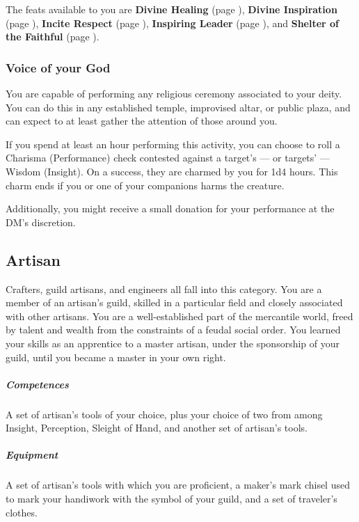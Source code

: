     The feats available to you are
    \textbf{Divine Healing} (page \pageref{feat::divinehealing}),
    \textbf{Divine Inspiration} (page \pageref{feat::divineinspiration}),
    \textbf{Incite Respect} (page \pageref{feat::inciterespect}),
    \textbf{Inspiring Leader} (page \pageref{feat::inspiringleader}), and
    \textbf{Shelter of the Faithful} (page \pageref{feat::shelterofthefaithful}).

    \subsubsection{Voice of your God} \label{feat::voiceofyourgod}
        You are capable of performing any religious ceremony associated to your deity.
        You can do this in any established temple, improvised altar, or public plaza, and can expect to at least gather the attention of those around you.

        If you spend at least an hour performing this activity, you can choose to roll a Charisma (Performance) check contested against a target's --- or targets' --- Wisdom (Insight).
        On a success, they are charmed by you for 1d4 hours.
        This charm ends if you or one of your companions harms the creature.

        Additionally, you might receive a small donation for your performance at the DM's discretion.

\subsection*{Artisan} \label{ssec::artisan}
    Crafters, guild artisans, and engineers all fall into this category.
    You are a member of an artisan's guild, skilled in a particular field and closely associated with other artisans.
    You are a well-established part of the mercantile world, freed by talent and wealth from the constraints of a feudal social order.
    You learned your skills as an apprentice to a master artisan, under the sponsorship of your guild, until you became a master in your own right.
    \subparagraph{Competences} A set of artisan's tools of your choice, plus your choice of two from among Insight, Perception, Sleight of Hand, and another set of artisan's tools.
    \subparagraph{Equipment} A set of artisan's tools with which you are proficient, a maker's mark chisel used to mark your handiwork with the symbol of your guild, and a set of traveler's clothes.

